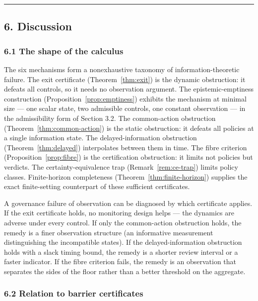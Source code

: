 \documentclass[11pt]{article}
\theoremstyle{definition}
\begin{document}
\begin{center}\rule{0.5\linewidth}{0.5pt}\end{center}

\subsection{6. Discussion}\label{discussion}

\subsubsection{6.1 The shape of the
calculus}\label{the-shape-of-the-calculus}

The six mechanisms form a nonexhaustive taxonomy of
information-theoretic failure. The exit certificate (Theorem~\ref{thm:exit}) is the
dynamic obstruction: it defeats all controls, so it needs no observation
argument. The epistemic-emptiness construction (Proposition~\ref{prop:emptiness}) exhibits the
mechanism at minimal size --- one scalar state, two admissible controls,
one constant observation --- in the admissibility form of Section 3.2. The common-action obstruction (Theorem~\ref{thm:common-action}) is the static
obstruction: it defeats all policies at a single information state. The
delayed-information obstruction (Theorem~\ref{thm:delayed}) interpolates between them in
time. The fibre criterion (Proposition~\ref{prop:fibre}) is the certification obstruction:
it limits not policies but verdicts. The certainty-equivalence trap
(Remark~\ref{rem:ce-trap}) limits policy classes. Finite-horizon completeness
(Theorem~\ref{thm:finite-horizon}) supplies the exact finite-setting
counterpart of these sufficient certificates.

A governance failure of observation can be diagnosed by which
certificate applies. If the exit certificate holds, no monitoring design
helps --- the dynamics are adverse under every control. If only the
common-action obstruction holds, the remedy is a finer observation
structure (an informative measurement distinguishing the incompatible
states). If the delayed-information obstruction holds with a slack
timing bound, the remedy is a shorter review interval or a faster
indicator. If the fibre criterion fails, the remedy is an observation
that separates the sides of the floor rather than a better threshold on
the aggregate.

\subsubsection{6.2 Relation to barrier
certificates}\label{relation-to-barrier-certificates}
\end{document}
